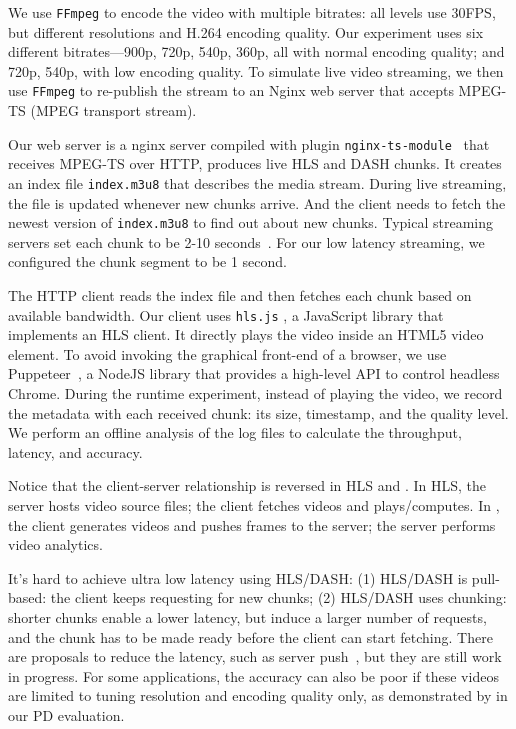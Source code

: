 \documentclass[twocolumn, 9pt]{article}
\begin{document}
 We use \texttt{FFmpeg} to encode the video with multiple bitrates:
all levels use 30FPS, but different resolutions and H.264 encoding quality. Our
experiment uses six different bitrates---900p, 720p, 540p, 360p, all with normal
encoding quality; and 720p, 540p, with low encoding quality. To simulate live
video streaming, we then use \texttt{FFmpeg} to re-publish the stream to an
Nginx web server that accepts MPEG-TS (MPEG transport stream).

 Our web server is a nginx server compiled with plugin
\texttt{nginx-ts-module}~\cite{nginx-ts-module} that receives MPEG-TS over HTTP,
produces live HLS and DASH chunks. It creates an index file \texttt{index.m3u8}
that describes the media stream. During live streaming, the file is updated
whenever new chunks arrive. And the client needs to fetch the newest version of
\texttt{index.m3u8} to find out about new chunks. Typical streaming servers set
each chunk to be 2-10 seconds~\cite{mao2017neural, sun2016cs2p,
  wang2016anatomy}. For our low latency streaming, we configured the chunk
segment to be 1 second.

 The HTTP client reads the index file and then fetches each
chunk based on available bandwidth. Our client uses \texttt{hls.js}
\cite{hls.js}, a JavaScript library that implements an HLS client. It directly
plays the video inside an HTML5 video element. To avoid invoking the graphical
front-end of a browser, we use Puppeteer~\cite{puppeteer}, a NodeJS library that
provides a high-level API to control headless Chrome. During the runtime
experiment, instead of playing the video, we record the metadata with each
received chunk: its size, timestamp, and the quality level. We perform an
offline analysis of the log files to calculate the throughput, latency, and
accuracy.

Notice that the client-server relationship is reversed in HLS and \sysname{}. In
HLS, the server hosts video source files; the client fetches videos and
plays/computes. In \sysname{}, the client generates videos and pushes frames to
the server; the server performs video analytics.

\vspace{1em}
 It's hard to achieve
ultra low latency using HLS/DASH: (1) HLS/DASH is pull-based: the client keeps
requesting for new chunks; (2) HLS/DASH uses chunking: shorter chunks enable a
lower latency, but induce a larger number of requests, and the chunk has to be
made ready before the client can start fetching. There are proposals to reduce
the latency, such as server push~\cite{wei2014low}, but they are still work in
progress. For some applications, the accuracy can also be poor if these videos
are limited to tuning resolution and encoding quality only, as demonstrated by
in our PD evaluation.


{\footnotesize 
  }
\end{document}
